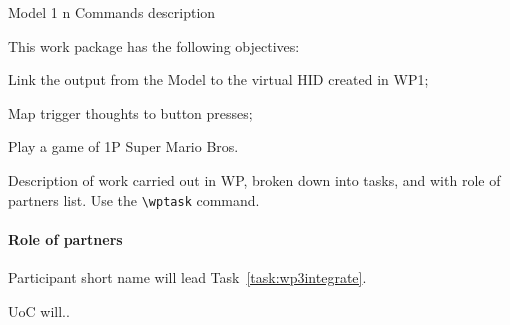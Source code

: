 
\begin{workpackage}{Model 1 n Commands}
  \label{wp:m1cN} %
description



  \makewptable %
    
  \begin{wpobjectives}
    This work package has the following objectives:
    \begin{enumerate*}
    \item Link the output from the Model to the virtual HID created in WP1;
    \item Map trigger thoughts to button presses; 
    \item Play a game of 1P Super Mario Bros.
    \end{enumerate*}
  \end{wpobjectives}
  
  \begin{wpdescription}
 
    Description of work carried out in WP, broken down into tasks, and
    with role of partners list. Use the \texttt{\textbackslash wptask} command.

    
    \paragraph{Role of partners}
    \begin{description*}
    \item[Participant short name] will lead Task~\ref{task:wp3integrate}.
    \item[UoC] will..
    \end{description*}
  \end{wpdescription}
  

\end{workpackage}
